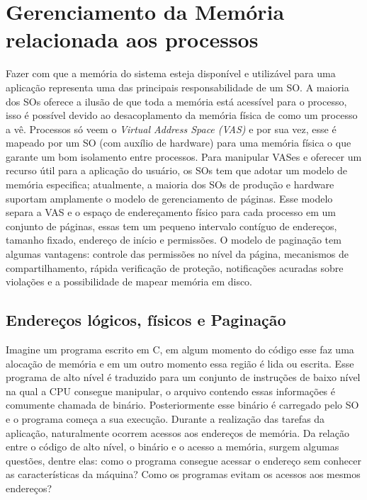 \section{Gerenciamento da Memória relacionada aos processos}

Fazer com que a memória do sistema esteja disponível e utilizável para uma
aplicação representa uma das principais responsabilidade de um SO. A maioria
dos SOs oferece a ilusão de que toda a memória está acessível para o processo,
isso é possível devido ao desacoplamento da memória física de como um processo
a vê. Processos só veem o \emph{Virtual Address Space (VAS)} e por sua vez, esse
é mapeado por um SO (com auxílio de hardware) para uma memória física o que
garante um bom isolamento entre processos. Para manipular VASes e oferecer um
recurso útil para a aplicação do usuário, os SOs tem que adotar um modelo de
memória especifica; atualmente, a maioria dos SOs de produção e hardware
suportam amplamente o modelo de gerenciamento de páginas.  Esse modelo separa a
VAS e o espaço de endereçamento físico para cada processo em um conjunto de
páginas, essas tem um pequeno intervalo contíguo de endereços, tamanho fixado,
endereço de início e permissões. O modelo de paginação tem algumas vantagens:
controle das permissões no nível da página, mecanismos de compartilhamento,
rápida verificação de proteção, notificações acuradas sobre violações e a
possibilidade de mapear memória em disco.

\subsection{Endereços lógicos, físicos e Paginação}


Imagine um programa escrito em C, em algum momento do código esse faz uma
alocação de memória e em um outro momento essa região é lida ou escrita. Esse
programa de alto nível é traduzido para um conjunto de instruções de baixo
nível na qual a CPU consegue manipular, o arquivo contendo essas informações é
comumente chamada de binário.  Posteriormente esse binário é carregado pelo SO
e o programa começa a sua execução. Durante a realização das tarefas da
aplicação, naturalmente ocorrem acessos aos endereços de memória. Da relação
entre o código de alto nível, o binário e o acesso a memória, surgem algumas
questões, dentre elas: como o programa consegue acessar o endereço sem conhecer
as características da máquina? Como os programas evitam os acessos aos mesmos
endereços?

